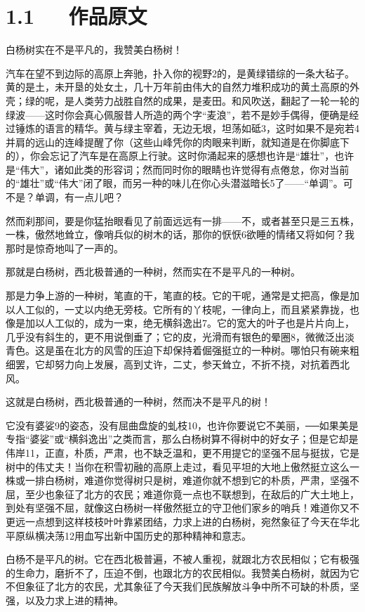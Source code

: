 \documentclass[letterpaper,12pt,english]{sphinxmanual}
\begin{document}
\section{1.1   作品原文}
\label{\detokenize{p01_u6563_u6587/_u8305_u76fe-_u767d_u6768_u793c_u8d5e:id3}}
白杨树实在不是平凡的，我赞美白杨树！

汽车在望不到边际的高原上奔驰，扑入你的视野2的，是黄绿错综的一条大毡子。黄的是土，未开垦的处女土，几十万年前由伟大的自然力堆积成功的黄土高原的外壳；绿的呢，是人类劳力战胜自然的成果，是麦田。和风吹送，翻起了一轮一轮的绿波——这时你会真心佩服昔人所造的两个字“麦浪”，若不是妙手偶得，便确是经过锤炼的语言的精华。黄与绿主宰着，无边无垠，坦荡如砥3，这时如果不是宛若4并肩的远山的连峰提醒了你（这些山峰凭你的肉眼来判断，就知道是在你脚底下的），你会忘记了汽车是在高原上行驶。这时你涌起来的感想也许是“雄壮”，也许是“伟大”，诸如此类的形容词；然而同时你的眼睛也许觉得有点倦怠，你对当前的“雄壮”或“伟大”闭了眼，而另一种的味儿在你心头潜滋暗长5了——“单调”。可不是？单调，有一点儿吧？

然而刹那间，要是你猛抬眼看见了前面远远有一排——不，或者甚至只是三五株，一株，傲然地耸立，像哨兵似的树木的话，那你的恹恹6欲睡的情绪又将如何？我那时是惊奇地叫了一声的。

那就是白杨树，西北极普通的一种树，然而实在不是平凡的一种树。

那是力争上游的一种树，笔直的干，笔直的枝。它的干呢，通常是丈把高，像是加以人工似的，一丈以内绝无旁枝。它所有的丫枝呢，一律向上，而且紧紧靠拢，也像是加以人工似的，成为一束，绝无横斜逸出7。它的宽大的叶子也是片片向上，几乎没有斜生的，更不用说倒垂了；它的皮，光滑而有银色的晕圈8，微微泛出淡青色。这是虽在北方的风雪的压迫下却保持着倔强挺立的一种树。哪怕只有碗来粗细罢，它却努力向上发展，高到丈许，二丈，参天耸立，不折不挠，对抗着西北风。

这就是白杨树，西北极普通的一种树，然而决不是平凡的树！

它没有婆娑9的姿态，没有屈曲盘旋的虬枝10，也许你要说它不美丽，──如果美是专指“婆娑”或“横斜逸出”之类而言，那么白杨树算不得树中的好女子；但是它却是伟岸11，正直，朴质，严肃，也不缺乏温和，更不用提它的坚强不屈与挺拔，它是树中的伟丈夫！当你在积雪初融的高原上走过，看见平坦的大地上傲然挺立这么一株或一排白杨树，难道你觉得树只是树，难道你就不想到它的朴质，严肃，坚强不屈，至少也象征了北方的农民；难道你竟一点也不联想到，在敌后的广大土地上，到处有坚强不屈，就像这白杨树一样傲然挺立的守卫他们家乡的哨兵！难道你又不更远一点想到这样枝枝叶叶靠紧团结，力求上进的白杨树，宛然象征了今天在华北平原纵横决荡12用血写出新中国历史的那种精神和意志。

白杨不是平凡的树。它在西北极普遍，不被人重视，就跟北方农民相似；它有极强的生命力，磨折不了，压迫不倒，也跟北方的农民相似。我赞美白杨树，就因为它不但象征了北方的农民，尤其象征了今天我们民族解放斗争中所不可缺的朴质，坚强，以及力求上进的精神。
\end{document}
